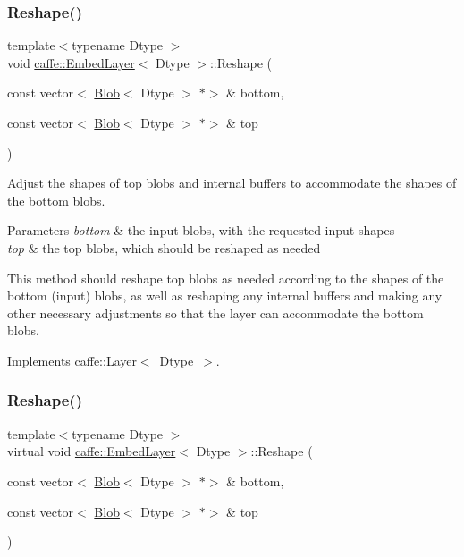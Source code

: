 \subsubsection{\texorpdfstring{Reshape()}{Reshape()}\hspace{0.1cm}{\footnotesize\ttfamily [1/2]}}
{\footnotesize\ttfamily template$<$typename Dtype $>$ \\
void \mbox{\hyperlink{classcaffe_1_1_embed_layer}{caffe\+::\+Embed\+Layer}}$<$ Dtype $>$\+::Reshape (\begin{DoxyParamCaption}\item[{const vector$<$ \mbox{\hyperlink{classcaffe_1_1_blob}{Blob}}$<$ Dtype $>$ $\ast$$>$ \&}]{bottom,  }\item[{const vector$<$ \mbox{\hyperlink{classcaffe_1_1_blob}{Blob}}$<$ Dtype $>$ $\ast$$>$ \&}]{top }\end{DoxyParamCaption})\hspace{0.3cm}{\ttfamily [virtual]}}



Adjust the shapes of top blobs and internal buffers to accommodate the shapes of the bottom blobs. 


\begin{DoxyParams}{Parameters}
{\em bottom} & the input blobs, with the requested input shapes \\
\hline
{\em top} & the top blobs, which should be reshaped as needed\\
\hline
\end{DoxyParams}
This method should reshape top blobs as needed according to the shapes of the bottom (input) blobs, as well as reshaping any internal buffers and making any other necessary adjustments so that the layer can accommodate the bottom blobs. 

Implements \mbox{\hyperlink{classcaffe_1_1_layer_a7fe981e8af8d93d587acf2a952be563d}{caffe\+::\+Layer$<$ Dtype $>$}}.

\mbox{\label{classcaffe_1_1_embed_layer_ab388111d4ccdbcf081030ccd2e258f69}} 
\subsubsection{\texorpdfstring{Reshape()}{Reshape()}\hspace{0.1cm}{\footnotesize\ttfamily [2/2]}}
{\footnotesize\ttfamily template$<$typename Dtype $>$ \\
virtual void \mbox{\hyperlink{classcaffe_1_1_embed_layer}{caffe\+::\+Embed\+Layer}}$<$ Dtype $>$\+::Reshape (\begin{DoxyParamCaption}\item[{const vector$<$ \mbox{\hyperlink{classcaffe_1_1_blob}{Blob}}$<$ Dtype $>$ $\ast$$>$ \&}]{bottom,  }\item[{const vector$<$ \mbox{\hyperlink{classcaffe_1_1_blob}{Blob}}$<$ Dtype $>$ $\ast$$>$ \&}]{top }\end{DoxyParamCaption})\hspace{0.3cm}{\ttfamily [virtual]}}



